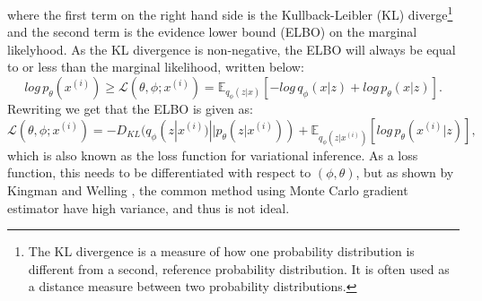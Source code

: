 where the first term on the right hand side is the Kullback-Leibler (KL) diverge\footnote{The KL divergence is a measure of how one 
probability distribution is different from a second, reference probability distribution. It is often used as a distance measure 
between two probability distributions.} and the second term is the evidence lower bound (ELBO) on the marginal likelyhood. As the KL divergence
is non-negative, the ELBO will always be equal to or less than the marginal likelihood, written below:
\begin{equation}\label{eq:elbo_leq1}
    log\, p_{\theta}(x^{(i)}) \geq \mathcal{L}(\theta, \phi;x^{(i)}) = \mathbb{E}_{q_{\phi}(z|x)}[-log\, q_{\phi}(x|z)+log\, p_{\theta}(x|z)].
\end{equation}
Rewriting we get that the ELBO is given as:
\begin{equation}\label{eq:elbo_leq2}
    \mathcal{L}(\theta, \phi;x^{(i)}) =  - D_{KL}(q_{\phi}(z|x^{(i)})||p_{\theta}(z|x^{(i)})) + \mathbb{E}_{q_{\phi}(z|x^{(i)})}[log\, p_{\theta}(x^{(i)}|z)],
\end{equation}
which is also known as the loss function for variational inference. As a loss function, this needs to be differentiated with respect to 
$(\phi, \theta)$, but as shown by Kingman and Welling \cite{VAE}, the common method using Monte Carlo gradient estimator have high variance,
and thus is not ideal. 

